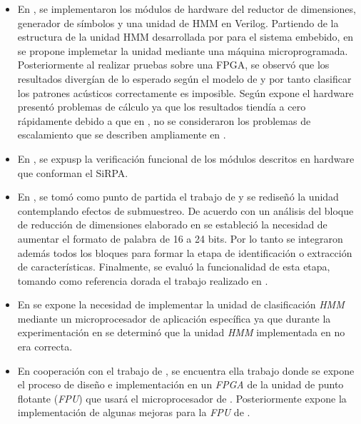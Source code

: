 \begin{itemize}
\item {En \cite{Lalfaro}, se implementaron los módulos de hardware del reductor de dimensiones, generador de símbolos y una unidad de HMM en Verilog. Partiendo de la estructura de la unidad HMM desarrollada por \cite{Jordanthesis} para el sistema embebido, en \cite{Lalfaro} se propone implemetar la unidad mediante una máquina microprogramada. Posteriormente al realizar pruebas sobre una FPGA, se observó que los resultados divergían de lo esperado según el modelo de \cite{Jordanthesis} y por tanto clasificar los patrones acústicos correctamente es imposible. Según expone \cite{Carlosthesis} el hardware presentó problemas de cálculo ya que los resultados tiendía a cero rápidamente debido a que en \cite{Lalfaro}, no se consideraron los problemas de escalamiento que se describen ampliamente en \cite{LRabiner}.}

\item {En \cite{Mau}, se expusp la verificación funcional de los módulos descritos en hardware que conforman el SiRPA.}

\item {En \cite{mio}, se tomó como punto de partida el trabajo de \cite{Esalas} y se rediseñó la unidad contemplando efectos de submuestreo. De acuerdo con un análisis del bloque de reducción de dimensiones elaborado en \cite{Lalfaro} se estableció la necesidad de aumentar el formato de palabra de 16 a 24 bits. Por lo tanto se integraron además todos los bloques para formar la etapa de identificación o extracción de características. Finalmente, se evaluó la funcionalidad de esta etapa, tomando como referencia dorada el trabajo realizado en \cite{Jordanthesis}.}

\item {En \cite{Carlosthesis} se expone la necesidad de implementar la unidad de clasificación \textit{HMM} mediante un microprocesador de aplicación específica ya que durante la experimentación en \cite{mio} se determinó que la unidad \textit{HMM} implementada en \cite{Lalfaro} no era correcta.}

\item En cooperación con el trabajo de \cite{Carlosthesis}, se encuentra ella trabajo \cite{Diego2015} donde se expone el proceso de diseño e implementación en un \textit{FPGA} de la unidad de punto flotante (\textit{FPU}) que usará el microprocesador de \cite{Carlosthesis}. Posteriormente \cite{Francis2016} expone la implementación de algunas mejoras para la \textit{FPU} de \cite{Diego2015}.

\end{itemize}

